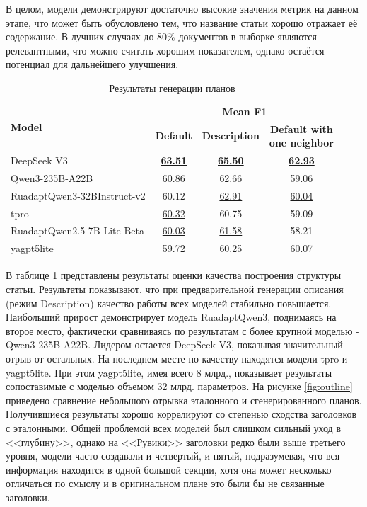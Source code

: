 \documentclass{article}
\begin{document}
В целом, модели демонстрируют достаточно высокие значения метрик на данном этапе, что может быть обусловлено тем, что название статьи хорошо отражает её содержание. 
В лучших случаях до 80\% документов в выборке являются релевантными, что можно считать хорошим показателем, однако остаётся потенциал для дальнейшего улучшения.

\begin{table}[ht!]
\centering
\caption{Результаты генерации планов}
\begin{tabular}{l|c|c|c}
\hline
\multirow{2}{*}{\textbf{Model}} & \multicolumn{3}{c}{\textbf{Mean F1}} \\
\cline{2-4}
 & \textbf{Default} & \textbf{Description} & \makecell{\textbf{Default with} \\ \textbf{one neighbor}} \\
\hline
DeepSeek V3                                         & \uline{\textbf{63.51}} & \uline{\textbf{65.50}} & \uline{\textbf{62.93}} \\
Qwen3-235B-A22B                                     & 60.86 & 62.66 & 59.06 \\
\hline
RuadaptQwen3-\allowbreak 32BInstruct-v2             & 60.12 & \uline{62.91} & \uline{60.04} \\
tpro                                                & \uline{60.32} & 60.75 & 59.09 \\
\hline
RuadaptQwen2.5-7B-\allowbreak Lite-\allowbreak Beta & \uline{60.03} & \uline{61.58} & 58.21 \\
yagpt5lite                                          & 59.72 & 60.25 & \uline{60.07} \\
\hline
\end{tabular}
\label{tab:outline_res}
\end{table}

В таблице \ref{tab:outline_res} представлены результаты оценки качества построения структуры статьи. Результаты показывают, что при предварительной генерации описания (режим Description) 
качество работы всех моделей стабильно повышается. 
Наибольший прирост демонстрирует модель RuadaptQwen3, поднимаясь на второе место, фактически сравниваясь по результатам с более крупной моделью
- Qwen3-\allowbreak 235B-\allowbreak A22B. Лидером остается DeepSeek V3, показывая значительный отрыв от остальных. На последнем месте по качеству находятся модели tpro и yagpt5lite.
При этом yagpt5lite, имея всего 8 млрд., показывает результаты сопоставимые с моделью объемом 32 млрд. параметров.
На рисунке \ref{fig:outline} приведено сравнение небольшого отрывка эталонного и сгенерированного планов.
Получившиеся результаты хорошо коррелируют со степенью сходства заголовков с эталонными. Общей проблемой всех моделей был слишком сильный уход в <<глубину>>, однако
на <<Рувики>> заголовки редко были выше третьего уровня, модели часто создавали и четвертый, и пятый, подразумевая, что вся информация находится в одной большой секции, хотя
она может несколько отличаться по смыслу и в оригинальном плане это были бы не связанные заголовки.
\end{document}
